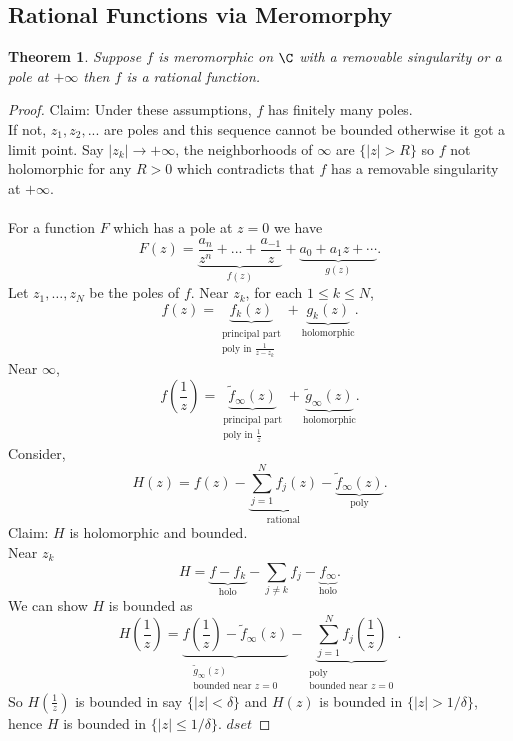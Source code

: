 \documentclass[a4paper]{article}
\newtheorem{thm}{Theorem}[section]
\begin{document}
\subsection{Rational Functions via Meromorphy}
\begin{thm}
    Suppose $f$ is meromorphic on $\C$ with a removable singularity or a pole at $+\infty$ then $f$ is a rational function.
\end{thm}
\begin{proof}
    Claim: Under these assumptions, $f$ has finitely many poles. \\
    If not, $z_1,z_2,...$ are poles and this sequence cannot be bounded otherwise it got a limit point. Say $|z_k|\to +\infty$, the neighborhoods of $\infty$ are $ \{|z|>R\}$ so $f$ not holomorphic for any $R>0$ which contradicts that $f$ has a removable singularity at $+\infty$. \\\\
    For a function $F$ which has a pole at $z=0$ we have \[
    F(z)=\underbrace{\frac{a_n}{z^n}+...+\frac{a_{-1}}{z}}_{f(z)}+ \underbrace{a_0+a_1z+\cdots}_{g(z)}
    .\] 
    Let $z_1,\ldots,z_N$ be the poles of $f$. Near $z_k$, for each $1\leq k \leq N$,
    \[
    f(z)=\underbrace{f_k(z)}_{\substack{\text{principal part}\\\text{poly in }\frac{1}{z-z_k}}}+ \underbrace{g_k(z)}_{\text{holomorphic}}.
    \]
    Near $\infty$,
    \[
    f\!\left(\frac{1}{z}\right)=\underbrace{\tilde{f}_\infty(z)}_{\substack{\text{principal part}\\\text{poly in }\frac{1}{z}}}+ \underbrace{\tilde{g}_\infty(z)}_{\text{holomorphic}}.
    \] 
    Consider,
    \[
    H(z)=f(z)-\underbrace{\sum_{j=1}^N f_j(z)}_{ \text{rational}}-\underbrace{\tilde{f}_\infty(z)}_{ \text{poly}}
    .\] 
    Claim: $H$ is holomorphic and bounded. \\
    Near $z_k$ \[
    H=\underbrace{f-f_k}_{\text{holo}}-\sum_{j\neq k} f_j-\underbrace{f_\infty}_{\text{holo}} 
    .\] 
    We can show $H$ is bounded as \[
    H\!\left(\frac{1}{z}\right)= \underbrace{f\!\left(\frac{1}{z}\right)-\tilde{f}_\infty(z)}_{\substack{\tilde{g}_\infty(z)\\\text{bounded near $z=0$}}}- \underbrace{\sum_{j=1}^N f_j\!\left(\frac{1}{z}\right)}_{\substack{\text{poly}\\\text{bounded near $z=0$}}}
    .\] 
    So $H(\frac{1}{z})$ is bounded in say $\{|z|<\delta\}$ and $H(z)$ is bounded in $\{|z|>1/\delta\}$, hence $H$ is bounded in $\{|z|\leq 1/\delta\}$. $ dset$
\end{proof}
\newpage
\end{document}

